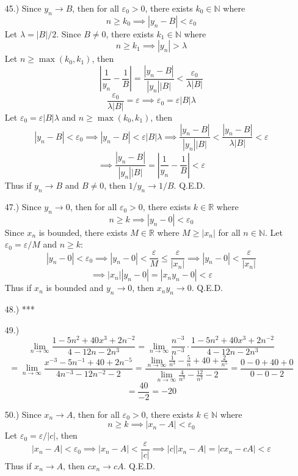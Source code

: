 \documentclass[12pt]{article}
\newcommand{\vertb}[1]{\left\vert#1\right\vert}
\newcommand{\e}{\varepsilon}
\newcommand{\lm}[1]{\displaystyle\lim_{#1}}
\begin{document}
\begin{itemize}
    \item [45.)] Since $y_n\to B$, then for all $\e_0>0$, there exists $k_0\in\mathbb{N}$ where
    \[n\geq k_0\implies\vertb{y_n-B}<\e_0\]
    Let $\lambda=\vertb{B}/2$. Since $B\neq0$, there exists $k_1\in\mathbb{N}$ where
    \[n\geq k_1\implies\vertb{y_n}>\lambda\]
    Let $n\geq\max(k_0,k_1)$, then
    \[\vertb{\frac{1}{y_n}-\frac{1}{B}}=\frac{\vertb{y_n-B}}{\vertb{y_n}\vertb{B}}<\frac{\e_0}{\lambda\vertb{B}}\]
    \[\frac{\e_0}{\lambda\vertb{B}}=\e\implies\e_0=\e\vertb{B}\lambda\]
    Let $\e_0=\e\vertb{B}\lambda$ and $n\geq\max(k_0,k_1)$, then
    \[\vertb{y_n-B}<\e_0\implies\vertb{y_n-B}<\e\vertb{B}\lambda\implies \frac{\vertb{y_n-B}}{\vertb{y_n}\vertb{B}}<\frac{\vertb{y_n-B}}{\lambda\vertb{B}}<\e\]
    \[\implies\frac{\vertb{y_n-B}}{\vertb{y_n}\vertb{B}}=\vertb{\frac{1}{y_n}-\frac{1}{B}}<\e\]
    Thus if $y_n\to B$ and $B\neq0$, then $1/y_n\to1/B$. Q.E.D.

    \item [47.)] Since $y_n\to0$, then for all $\e_0>0$, there exists $k\in\mathbb{R}$ where
    \[n\geq k\implies\vertb{y_n-0}<\e_0\]
    Since $x_n$ is bounded, there exists $M\in\mathbb{R}$ where $M\geq\vertb{x_n}$ for all $n\in\mathbb{N}$. Let $\e_0=\e/M$ and $n\geq k$:
    \[\vertb{y_n-0}<\e_0\implies\vertb{y_n-0}<\frac{\e}{M}\leq\frac{\e}{\vertb{x_n}}\implies\vertb{y_n-0}<\frac{\e}{\vertb{x_n}}\]
    \[\implies\vertb{x_n}\vertb{y_n-0}=\vertb{x_ny_n-0}<\e\]
    Thus if $x_n$ is bounded and $y_n\to0$, then $x_ny_n\to0$. Q.E.D.

    \item [48.)] ***

    \item [49.)]
    \[\lm{n\to\infty}\frac{1-5n^2+40x^3+2n^{-2}}{4-12n-2n^3}=\lm{n\to\infty}\frac{n^{-3}}{n^{-3}}\cdot\frac{1-5n^2+40x^3+2n^{-2}}{4-12n-2n^3}\]
    \[=\lm{n\to\infty}\frac{x^{-3}-5n^{-1}+40+2n^{-5}}{4n^{-3}-12n^{-2}-2}=\frac{\lm{n\to\infty}\frac{1}{n^3}-\frac{5}{n}+40+\frac{2}{n^5}}{\lm{n\to\infty}\frac{4}{n^3}-\frac{12}{n^2}-2}=\frac{0-0+40+0}{0-0-2}\]
    \[=\frac{40}{-2}=-20\]

    \item [50.)] Since $x_n\to A$, then for all $\e_0>0$, there exists $k\in\mathbb{N}$ where
    \[n\geq k\implies\vertb{x_n-A}<\e_0\]
    Let $\e_0=\e/\vertb{c}$, then
    \[\vertb{x_n-A}<\e_0\implies\vertb{x_n-A}<\frac{\e}{\vertb{c}}\implies\vertb{c}\vertb{x_n-A}=\vertb{cx_n-cA}<\e\]
    Thus if $x_n\to A$, then $cx_n\to cA$. Q.E.D.



\end{itemize}
\end{document}
